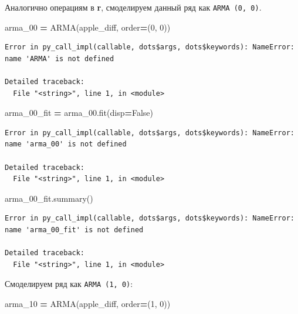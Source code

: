 \documentclass[]{book}
\newenvironment{Shaded}{\begin{snugshade}}{\end{snugshade}}
\newcommand{\DecValTok}[1]{\textcolor[rgb]{0.00,0.00,0.81}{#1}}
\newcommand{\NormalTok}[1]{#1}
\newcommand{\OperatorTok}[1]{\textcolor[rgb]{0.81,0.36,0.00}{\textbf{#1}}}
\newcommand{\VariableTok}[1]{\textcolor[rgb]{0.00,0.00,0.00}{#1}}
\begin{document}
Аналогично операциям в \textbf{r}, смоделируем данный ряд как \texttt{ARMA\ (0,\ 0)}.

\begin{Shaded}
\begin{Highlighting}[]
\NormalTok{arma_00 }\OperatorTok{=}\NormalTok{ ARMA(apple_diff, order}\OperatorTok{=}\NormalTok{(}\DecValTok{0}\NormalTok{, }\DecValTok{0}\NormalTok{))}
\end{Highlighting}
\end{Shaded}

\begin{verbatim}
Error in py_call_impl(callable, dots$args, dots$keywords): NameError: name 'ARMA' is not defined

Detailed traceback: 
  File "<string>", line 1, in <module>
\end{verbatim}

\begin{Shaded}
\begin{Highlighting}[]
\NormalTok{arma_00_fit }\OperatorTok{=}\NormalTok{ arma_00.fit(disp}\OperatorTok{=}\VariableTok{False}\NormalTok{)}
\end{Highlighting}
\end{Shaded}

\begin{verbatim}
Error in py_call_impl(callable, dots$args, dots$keywords): NameError: name 'arma_00' is not defined

Detailed traceback: 
  File "<string>", line 1, in <module>
\end{verbatim}

\begin{Shaded}
\begin{Highlighting}[]
\NormalTok{arma_00_fit.summary()}
\end{Highlighting}
\end{Shaded}

\begin{verbatim}
Error in py_call_impl(callable, dots$args, dots$keywords): NameError: name 'arma_00_fit' is not defined

Detailed traceback: 
  File "<string>", line 1, in <module>
\end{verbatim}

Смоделируем ряд как \texttt{ARMA\ (1,\ 0)}:

\begin{Shaded}
\begin{Highlighting}[]
\NormalTok{arma_10 }\OperatorTok{=}\NormalTok{ ARMA(apple_diff, order}\OperatorTok{=}\NormalTok{(}\DecValTok{1}\NormalTok{, }\DecValTok{0}\NormalTok{))}
\end{Highlighting}
\end{Shaded}
\end{document}
